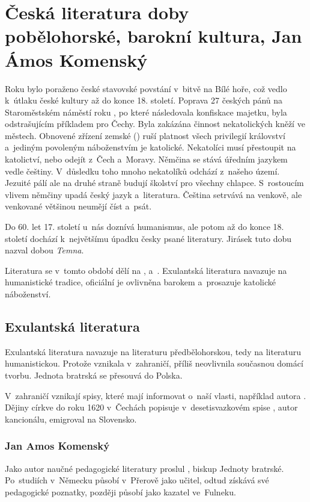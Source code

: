 \chapter[Česká pobělohorská literatura, baroko]{Česká literatura doby pobělohorské, barokní kultura, Jan Ámos Komenský} %
Roku  bylo poraženo české stavovské povstání v~bitvě na Bílé hoře, což vedlo k~útlaku
české kultury až do konce 18. století.
Poprava 27 českých pánů na Staroměstském náměstí roku , po které následovala konfiskace majetku,
byla odstrašujícím příkladem pro  Čechy. Byla zakázána činnost nekatolických kněží ve městech.
Obnovené zřízení zemské () ruší platnost všech privilegií království a~jediným povoleným náboženstvím
je katolické. Nekatolíci musí přestoupit na katolictví, nebo odejít z~Čech a~Moravy.
Němčina se stává úředním jazykem vedle češtiny. V~důsledku toho mnoho nekatolíků odchází z~našeho území.
Jezuité pálí  ale na druhé straně budují školství pro všechny chlapce.
S~rostoucím vlivem němčiny upadá český jazyk a~literatura. Čeština setrvává na venkově, ale venkované
většinou neumějí číst a~psát.

Do 60. let 17. století u~nás doznívá humanismus, ale potom až do konce 18. století dochází k~největšímu
úpadku česky psané literatury. Jirásek tuto dobu nazval dobou \textit{Temna}. 

Literatura se v~tomto období dělí na , 
a~. Exulantská literatura navazuje na humanistické tradice, 
oficiální je ovlivněna barokem a~prosazuje katolické náboženství.

\section{Exulantská literatura}
Exulantská literatura navazuje na literaturu předbělohorskou, tedy na literaturu humanistickou.
Protože vznikala v~zahraničí, příliš neovlivnila současnou domácí tvorbu. Jednota bratrská 
se přesouvá do Polska.

V~zahraničí vznikají spisy, které mají informovat o~naší vlasti, například 
autora .
Dějiny církve do roku 1620 v~Čechách popisuje  v~desetisvazkovém spise 
, autor kancionálu, emigroval na Slovensko.

\subsection*{Jan Amos Komenský}
Jako autor naučné pedagogické literatury proslul , biskup Jednoty bratrské.
Po~studiích v~Německu působí v~Přerově jako učitel, odtud získává své pedagogické poznatky, později 
působí jako kazatel ve~Fulneku.


